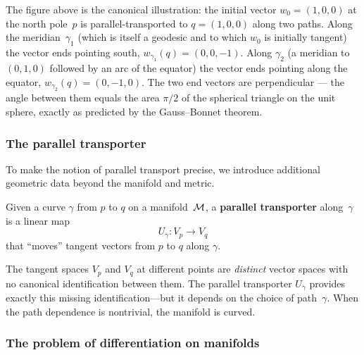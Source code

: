 

\noindent
The figure above is the canonical illustration: the initial vector
$w_0 = (1,0,0)$ at the north pole~$p$ is parallel-transported to
$q=(1,0,0)$ along two paths.  Along the meridian~$\gamma_1$ (which is
itself a geodesic and to which $w_0$ is initially tangent) the vector
ends pointing south, $w_{\gamma_1}\!(q) = (0,0,-1)$.  Along
$\gamma_2$ (a meridian to $(0,1,0)$ followed by an arc of the equator)
the vector ends pointing along the equator,
$w_{\gamma_2}\!(q) = (0,-1,0)$.  The two end vectors are perpendicular
--- the angle between them equals the area $\pi/2$ of the spherical
triangle on the unit sphere, exactly as predicted by the
Gauss--Bonnet theorem.

\subsubsection{The parallel transporter}\label{sec:parallel-transporter}

To make the notion of parallel transport precise, we introduce
additional geometric data beyond the manifold and metric.

\begin{definition}%
\label{def:parallel-transporter}
  Given a curve $\gamma$ from $p$ to $q$ on a manifold~$\mathcal{M}$,
  a \textbf{parallel transporter} along~$\gamma$ is a linear map
  \begin{equation}\label{eq:parallel-transporter}
    U_\gamma\colon V_p \longrightarrow V_q
  \end{equation}
  that ``moves'' tangent vectors from $p$ to $q$ along $\gamma$.
\end{definition}

\begin{remark}
  The tangent spaces $V_p$ and $V_q$ at different points are
  \emph{distinct} vector spaces with no canonical identification
  between them.  The parallel transporter $U_\gamma$ provides
  exactly this missing identification---but it depends on the
  choice of path~$\gamma$.  When the path dependence is
  nontrivial, the manifold is curved.
\end{remark}

\subsubsection{The problem of differentiation on manifolds}%
\label{sec:differentiation-problem}

